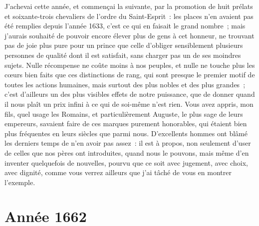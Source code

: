 \documentclass[french,twoside]{book} %
\begin{document}
J’achevai cette année, et commençai la suivante, par la promotion de huit prélats et soixante-trois chevaliers de l’ordre du Saint-Esprit : les places n’en avaient pas été remplies depuis l’année 1633, c’est ce qui en faisait le grand nombre ; mais j’aurais souhaité de pouvoir encore élever plus de gens à cet honneur, ne trouvant pas de joie plus pure pour un prince que celle d’obliger sensiblement plusieurs personnes de qualité dont il est satisfait, sans charger pas un de ses moindres sujets. Nulle récompense ne coûte moins à nos peuples, et nulle ne touche plus les cœurs bien faits que ces distinctions de rang, qui sont presque le premier motif de toutes les actions humaines, mais surtout des plus nobles et des plus grandes ; c’est d’ailleurs un des plus visibles effets de notre puissance, que de donner quand il nous plaît un prix infini à ce qui de soi-même n’est rien. Vous avez appris, mon fils, quel usage les Romains, et particulièrement Auguste, le plus sage de leurs empereurs, savaient faire de ces marques purement honorables, qui étaient bien plus fréquentes en leurs siècles que parmi nous. D’excellents hommes ont blâmé les derniers temps de n’en avoir pas assez : il est à propos, non seulement d’user de celles que nos pères ont introduites, quand nous le pouvons, mais même d’en inventer quelquefois de nouvelles, pourvu que ce soit avec jugement, avec choix, avec dignité, comme vous verrez ailleurs que j’ai tâché de vous en montrer l’exemple.
\section[{Année 1662}]{Année 1662}\renewcommand{\leftmark}{Année 1662}
\end{document}
